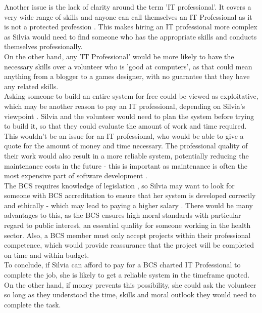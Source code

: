 \documentclass[12pt,a4paper]{article}
\begin{document}
Another issue is the lack of clarity around the term 'IT professional'. It covers a very wide range of skills and anyone can call themselves an IT Professional as it is not a protected profession \cite{ITProfessionalism}. This makes hiring an IT professional more complex as Silvia would need to find someone who has the appropriate skills and conducts themselves professionally.\\

On the other hand, any 'IT Professional' would be more likely to have the necessary skills over a volunteer who is 'good at computers', as that could mean anything from a blogger to a games designer, with no guarantee that they have any related skills.\\

Asking someone to build an entire system for free could be viewed as exploitative, which may be another reason to pay an IT professional, depending on Silvia's viewpoint \cite{exploitativeVolunteering}. Silvia and the volunteer would need to plan the system before trying to build it, so that they could evaluate the amount of work and time required.\\

This wouldn't be an issue for an IT professional, who would be able to give a quote for the amount of money and time necessary. The professional quality of their work would also result in a more reliable system, potentially reducing the maintenance costs in the future - this is important as maintenance is often the most expensive part of software development \cite{maintenanceCost}.\\

The BCS requires knowledge of legislation \cite{BCS}, so Silvia may want to look for someone with BCS accreditation to ensure that her system is developed correctly and ethically - which may lead to paying a higher salary \cite{BCSBenefits}. There would be many advantages to this, as the BCS ensures high moral standards with particular regard to public interest, an essential quality for someone working in the health sector. Also, a BCS member must only accept projects within their professional competence, which would provide reassurance that the project will be completed on time and within budget.\\

To conclude, if Silvia can afford to pay for a BCS charted IT Professional to complete the job, she is likely to get a reliable system in the timeframe quoted. On the other hand, if money prevents this possibility, she could ask the volunteer so long as they understood the time, skills and moral outlook they would need to complete the task.
\end{document}
